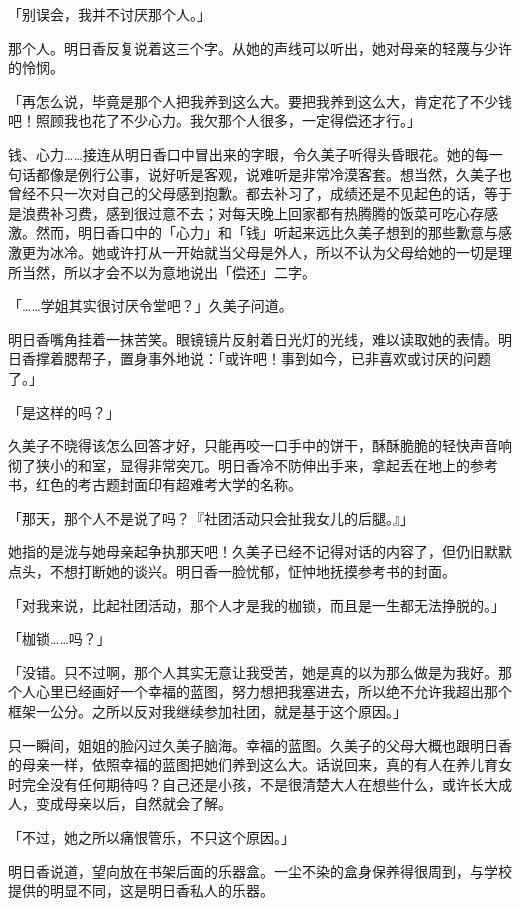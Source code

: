 \documentclass[UTF8]{ctexart}
\begin{document}
    「别误会，我并不讨厌那个人。」 

    那个人。明日香反复说着这三个字。从她的声线可以听出，她对母亲的轻蔑与少许的怜悯。 

    「再怎么说，毕竟是那个人把我养到这么大。要把我养到这么大，肯定花了不少钱吧！照顾我也花了不少心力。我欠那个人很多，一定得偿还才行。」 

    钱、心力……接连从明日香口中冒出来的字眼，令久美子听得头昏眼花。她的每一句话都像是例行公事，说好听是客观，说难听是非常冷漠客套。想当然，久美子也曾经不只一次对自己的父母感到抱歉。都去补习了，成绩还是不见起色的话，等于是浪费补习费，感到很过意不去；对每天晚上回家都有热腾腾的饭菜可吃心存感激。然而，明日香口中的「心力」和「钱」听起来远比久美子想到的那些歉意与感激更为冰冷。她或许打从一开始就当父母是外人，所以不认为父母给她的一切是理所当然，所以才会不以为意地说出「偿还」二字。 

    「……学姐其实很讨厌令堂吧？」久美子问道。 

    明日香嘴角挂着一抹苦笑。眼镜镜片反射着日光灯的光线，难以读取她的表情。明日香撑着腮帮子，置身事外地说：「或许吧！事到如今，已非喜欢或讨厌的问题了。」 

    「是这样的吗？」 

    久美子不晓得该怎么回答才好，只能再咬一口手中的饼干，酥酥脆脆的轻快声音响彻了狭小的和室，显得非常突兀。明日香冷不防伸出手来，拿起丢在地上的参考书，红色的考古题封面印有超难考大学的名称。 

    「那天，那个人不是说了吗？『社团活动只会扯我女儿的后腿。』」 

    她指的是泷与她母亲起争执那天吧！久美子已经不记得对话的内容了，但仍旧默默点头，不想打断她的谈兴。明日香一脸忧郁，怔忡地抚摸参考书的封面。 

    「对我来说，比起社团活动，那个人才是我的枷锁，而且是一生都无法挣脱的。」 

    「枷锁……吗？」 

    「没错。只不过啊，那个人其实无意让我受苦，她是真的以为那么做是为我好。那个人心里已经画好一个幸福的蓝图，努力想把我塞进去，所以绝不允许我超出那个框架一公分。之所以反对我继续参加社团，就是基于这个原因。」 

    只一瞬间，姐姐的脸闪过久美子脑海。幸福的蓝图。久美子的父母大概也跟明日香的母亲一样，依照幸福的蓝图把她们养到这么大。话说回来，真的有人在养儿育女时完全没有任何期待吗？自己还是小孩，不是很清楚大人在想些什么，或许长大成人，变成母亲以后，自然就会了解。 

    「不过，她之所以痛恨管乐，不只这个原因。」 

    明日香说道，望向放在书架后面的乐器盒。一尘不染的盒身保养得很周到，与学校提供的明显不同，这是明日香私人的乐器。 
\end{document}
